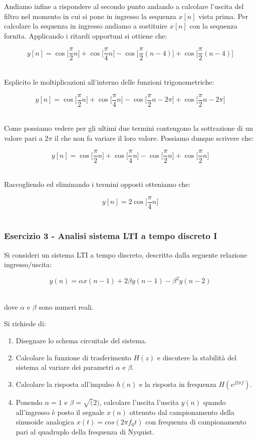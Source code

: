 \documentclass[../main.tex]{subfiles}
\begin{document}
Andiamo infine a rispondere al secondo punto andando a calcolare l'uscita del filtro nel momento in cui si pone in ingresso la sequenza $x[n]$ vista prima.
Per calcolare la sequenza in ingresso andiamo a sostituire $x[n]$ con la sequenza fornita.
Applicando i ritardi opportuni si ottiene che:

\[ y[n] = \cos\bigg[ \frac{\pi}{2} n \bigg] + \cos\bigg[ \frac{\pi}{4} n \bigg] - \cos\bigg[ \frac{\pi}{2} (n-4)\bigg]  + \cos\bigg[ \frac{\pi}{2} (n-4) \bigg] \]\

Esplicito le moltiplicazioni all'interno delle funzioni trigonometriche:


\[ y[n] = \cos\bigg[ \frac{\pi}{2} n \bigg] + \cos\bigg[ \frac{\pi}{4} n \bigg] - \cos\bigg[ \frac{\pi}{2} n - 2\pi \bigg]  + \cos\bigg[ \frac{\pi}{2} n - 2\pi \bigg] \]\

Come possiamo vedere per gli ultimi due termini contengono la sottrazione di un valore pari a $2\pi$ il che non fa variare il loro valore. Possiamo dunque scrivere che:

\[ y[n] = \cos\bigg[ \frac{\pi}{2} n \bigg] + \cos\bigg[ \frac{\pi}{4} n \bigg] - \cos\bigg[ \frac{\pi}{2} n  \bigg]  + \cos\bigg[ \frac{\pi}{2} n  \bigg] \]\

Raccogliendo ed eliminando i termini opposti otteniamo che:

\[ y[n] =  2\cos\bigg[ \frac{\pi}{4} n \bigg] \]\


\subsubsection{Esercizio 3 - Analisi sistema LTI a tempo discreto I}


Si consideri un sistema LTI a tempo discreto, descritto dalla seguente relazione ingresso/uscita:

\[ y(n) = \alpha x(n - 1) + 2\beta y(n - 1) - \beta^2 y (n - 2) \]\

dove $\alpha$ e $\beta$ sono numeri reali.


Si richiede di:

\begin{enumerate}
	\item[\textbf{1)}] Disegnare lo schema circuitale del sistema.
	\item[\textbf{2)}] Calcolare la funzione di trasferimento $H(z)$ e discutere la stabilità del sistema al variare dei parametri $\alpha$ e $\beta$.
	\item[\textbf{3)}] Calcolare la risposta all’impulso $h(n)$ e la risposta in frequenza $H(e^{j2\pi f})$.
	\item[\textbf{4)}] Ponendo $\alpha = 1$ e $\beta = \sqrt(2)$, calcolare l’uscita l’uscita $y(n)$ quando all’ingresso è posto il segnale $x(n)$ ottenuto dal campionamento della sinusoide analogica $x(t) = cos(2\pi f_0t)$ con frequenza di campionamento pari al quadruplo della frequenza di Nyquist.
\end{enumerate}
\end{document}
